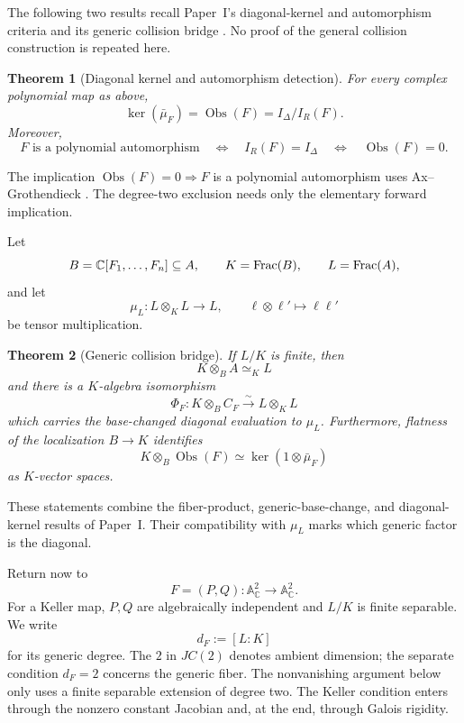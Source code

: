 \documentclass[11pt]{article}
\newtheorem{theorem}{Theorem}[section]
\newcommand{\A}{\mathbb A}
\newcommand{\C}{\mathbb C}
\newcommand{\Obs}{\operatorname{Obs}}
\begin{document}
The following two results recall Paper~I's diagonal-kernel and automorphism
criteria \cite[Proposition~2.2 and Theorem~2.7]{VanDerVlugt2026CubicCollision}
and its generic collision bridge
\cite[Theorem~2.5]{VanDerVlugt2026CubicCollision}.  No proof of the general
collision construction is repeated here.

\begin{theorem}[Diagonal kernel and automorphism detection]
\label{thm:quoted-diagonal-kernel}
For every complex polynomial map as above,
\[
  \ker(\bar\mu_F)=\Obs(F)=I_\Delta/I_R(F).
\]
Moreover,
\[
  F\text{ is a polynomial automorphism}
  \quad\Longleftrightarrow\quad
  I_R(F)=I_\Delta
  \quad\Longleftrightarrow\quad
  \Obs(F)=0.
\]
\end{theorem}

The implication \(\Obs(F)=0\Rightarrow F\) is a polynomial automorphism
uses Ax--Grothendieck
\cite{Ax1969}.  The degree-two exclusion needs only the elementary
forward implication.

Let
\[
  B=\C[F_1,\dots,F_n]\subseteq A,\qquad
  K=\Frac(B),\qquad
  L=\Frac(A),
\]
and let
\[
  \mu_L\colon L\otimes_KL\longrightarrow L,
  \qquad \ell\otimes\ell'\longmapsto\ell\ell'
\]
be tensor multiplication.

\begin{theorem}[Generic collision bridge]
\label{thm:quoted-generic-bridge}
If \(L/K\) is finite, then
\[
  K\otimes_BA\simeq_KL
\]
and there is a \(K\)-algebra isomorphism
\[
  \Phi_F\colon K\otimes_BC_F\xrightarrow{\ \sim\ }L\otimes_KL
\]
which carries the base-changed diagonal evaluation to \(\mu_L\).
Furthermore, flatness of the localization \(B\to K\) identifies
\[
  K\otimes_B\Obs(F)
  \simeq
  \ker(1\otimes\bar\mu_F)
\]
as \(K\)-vector spaces.
\end{theorem}

These statements combine the fiber-product, generic-base-change, and
diagonal-kernel results of Paper~I.  Their compatibility with \(\mu_L\)
marks which generic factor is the diagonal.

Return now to
\[
  F=(P,Q)\colon\A^2_{\C}\longrightarrow\A^2_{\C}.
\]
For a Keller map, \(P,Q\) are algebraically independent and \(L/K\) is
finite separable.  We write
\[
  d_F:=[L:K]
\]
for its generic degree.  The \(2\) in \(JC(2)\) denotes ambient dimension;
the separate condition \(d_F=2\) concerns the generic fiber.  The
nonvanishing argument below only uses a finite separable extension of
degree two.  The Keller condition enters through the nonzero constant
Jacobian and, at the end, through Galois rigidity.
\end{document}
